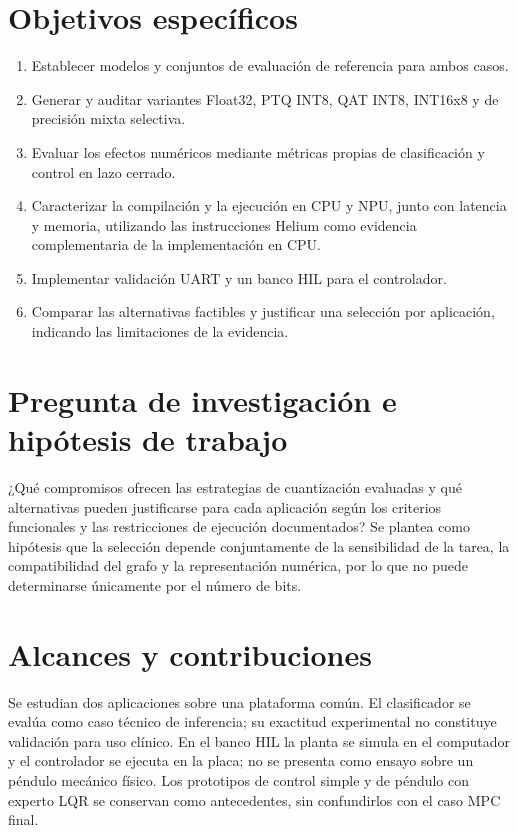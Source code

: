 \section{Objetivos específicos}
\begin{enumerate}
\item Establecer modelos y conjuntos de evaluación de referencia para ambos casos.
\item Generar y auditar variantes Float32, PTQ INT8, QAT INT8, INT16x8 y de precisión mixta selectiva.
\item Evaluar los efectos numéricos mediante métricas propias de clasificación y control en lazo cerrado.
\item Caracterizar la compilación y la ejecución en CPU y NPU, junto con latencia y memoria, utilizando las instrucciones Helium como evidencia complementaria de la implementación en CPU.
\item Implementar validación UART y un banco HIL para el controlador.
\item Comparar las alternativas factibles y justificar una selección por aplicación, indicando las limitaciones de la evidencia.
\end{enumerate}

\section{Pregunta de investigación e hipótesis de trabajo}
¿Qué compromisos ofrecen las estrategias de cuantización evaluadas y qué alternativas pueden justificarse para cada aplicación según los criterios funcionales y las restricciones de ejecución documentados? Se plantea como hipótesis que la selección depende conjuntamente de la sensibilidad de la tarea, la compatibilidad del grafo y la representación numérica, por lo que no puede determinarse únicamente por el número de bits.

\section{Alcances y contribuciones}
Se estudian dos aplicaciones sobre una plataforma común. El clasificador se evalúa como caso técnico de inferencia; su exactitud experimental no constituye validación para uso clínico. En el banco HIL la planta se simula en el computador y el controlador se ejecuta en la placa; no se presenta como ensayo sobre un péndulo mecánico físico. Los prototipos de control simple y de péndulo con experto LQR se conservan como antecedentes, sin confundirlos con el caso MPC final.

